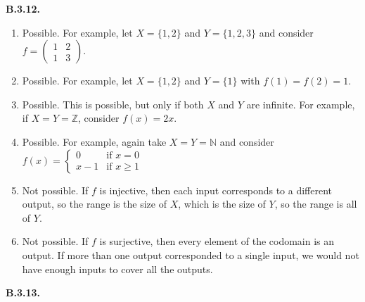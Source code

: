 \documentclass[10pt,]{book}
\theoremstyle{plain}
\theoremstyle{definition}
\theoremstyle{definition}
\theoremstyle{definition}
\theoremstyle{definition}
\numberwithin{equation}{chapter}
\def\N{\mathbb N}
\def\Z{\mathbb Z}
\newcommand{\amp}{&}
\begin{document}
%
\par\smallskip
\noindent\textbf{B.3.12.} \hypertarget{p-1857}{}%
\leavevmode%
\begin{enumerate}[label=(\alph*)]
\item\hypertarget{li-623}{}\hypertarget{p-1858}{}%
Possible. For example, let \(X=\{1,2\}\) and \(Y = \{1,2,3\}\) and consider \(f=\begin{pmatrix}1 \amp 2 \\ 1 \amp 3\end{pmatrix}\).%
\item\hypertarget{li-624}{}\hypertarget{p-1859}{}%
Possible. For example, let \(X = \{1,2\}\) and \(Y = \{1\}\) with \(f(1) = f(2) = 1\).%
\item\hypertarget{li-625}{}\hypertarget{p-1860}{}%
Possible. This is possible, but only if both \(X\) and \(Y\) are infinite. For example, if \(X = Y = \Z\), consider \(f(x) = 2x\).%
\item\hypertarget{li-626}{}\hypertarget{p-1861}{}%
Possible. For example, again take \(X = Y = \N\) and consider \(f(x) = \begin{cases} 0 \amp \text{if } x = 0 \\ x-1 \amp \text{if } x \ge 1\end{cases}\)%
\item\hypertarget{li-627}{}\hypertarget{p-1862}{}%
Not possible. If \(f\) is injective, then each input corresponds to a different output, so the range is the size of \(X\), which is the size of \(Y\), so the range is all of \(Y\).%
\item\hypertarget{li-628}{}\hypertarget{p-1863}{}%
Not possible. If \(f\) is surjective, then every element of the codomain is an output. If more than one output corresponded to a single input, we would not have enough inputs to cover all the outputs.%
\end{enumerate}
%
\par\smallskip
\noindent\textbf{B.3.13.} \hypertarget{p-1871}{}%
\leavevmode%
\end{document}
